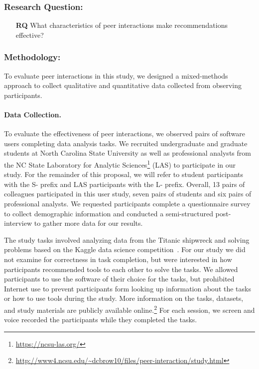 \subsubsection{Research Question:}

\begin{itemize}
  \item[\textbf{RQ}] What characteristics of peer interactions make recommendations effective?
\end{itemize}

\subsubsection{Methodology:}

To evaluate peer interactions in this study, we designed a mixed-methods approach to collect qualitative and quantitative data collected from observing participants.

\paragraph{Data Collection.} To evaluate the effectiveness of peer interactions, we observed pairs of software users completing data analysis tasks. We recruited undergraduate and graduate students at North Carolina State University as well as professional analysts from the NC State Laboratory for Analytic Sciences\footnote{\url{https://ncsu-las.org/}} (LAS) to participate in our study. For the remainder of this proposal, we will refer to student participants with the S- prefix and LAS participants with the L- prefix. Overall, 13 pairs of colleagues participated in this user study, seven pairs of students and six pairs of professional analysts. We requested participants complete a questionnaire survey to collect demographic information and conducted a semi-structured post-interview to gather more data for our results. 

The study tasks involved analyzing data from the Titanic shipwreck and solving problems based on the Kaggle data science competition~\cite{KaggleTitanic}. For our study we did not examine for correctness in task completion, but were interested in how participants recommended tools to each other to solve the tasks. We allowed participants to use the software of their choice for the tasks, but prohibited Internet use to prevent participants form looking up information about the tasks or how to use tools during the study. More information on the tasks, datasets, and study materials are publicly available online.\footnote{\url{http://www4.ncsu.edu/~dcbrow10/files/peer-interaction/study.html}} For each session, we screen and voice recorded the participants while they completed the tasks.

